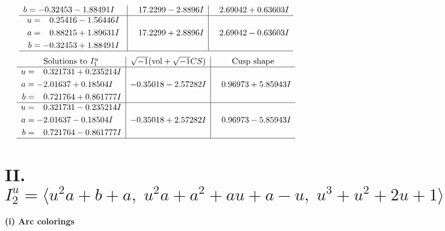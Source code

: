\documentclass[1p]{elsarticle_modified}
\theoremstyle{definition}
\newcommand{\I}{\sqrt{-1}}
\begin{document}
$$\begin{array}{c|c|c}
\begin{aligned}
b &= -0.32453 - 1.88491 I\end{aligned}
 & \phantom{-}17.2299 - 2.8896 I & \phantom{-}2.69042 + 0.63603 I \\ \hline\begin{aligned}
u &= \phantom{-}0.25416 - 1.56446 I \\
a &= \phantom{-}0.88215 + 1.89631 I \\
b &= -0.32453 + 1.88491 I\end{aligned}
 & \phantom{-}17.2299 + 2.8896 I & \phantom{-}2.69042 - 0.63603 I\\
 \hline 
 \end{array}$$\newpage$$\begin{array}{c|c|c}  
\text{Solutions to }I^u_{1}& \I (\text{vol} + \sqrt{-1}CS) & \text{Cusp shape}\\
 \hline 
\begin{aligned}
u &= \phantom{-}0.321731 + 0.235214 I \\
a &= -2.01637 + 0.18504 I \\
b &= \phantom{-}0.721764 + 0.861777 I\end{aligned}
 & -0.35018 - 2.57282 I & \phantom{-}0.96973 + 5.85943 I \\ \hline\begin{aligned}
u &= \phantom{-}0.321731 - 0.235214 I \\
a &= -2.01637 - 0.18504 I \\
b &= \phantom{-}0.721764 - 0.861777 I\end{aligned}
 & -0.35018 + 2.57282 I & \phantom{-}0.96973 - 5.85943 I\\
 \hline 
 \end{array}$$\newpage\newpage\renewcommand{\arraystretch}{1}
\centering \section*{II. $I^u_{2}= \langle u^2 a+b+a,\;u^2 a+a^2+a u+a- u,\;u^3+u^2+2 u+1 \rangle$}
\flushleft \textbf{(i) Arc colorings}\\
\end{document}
